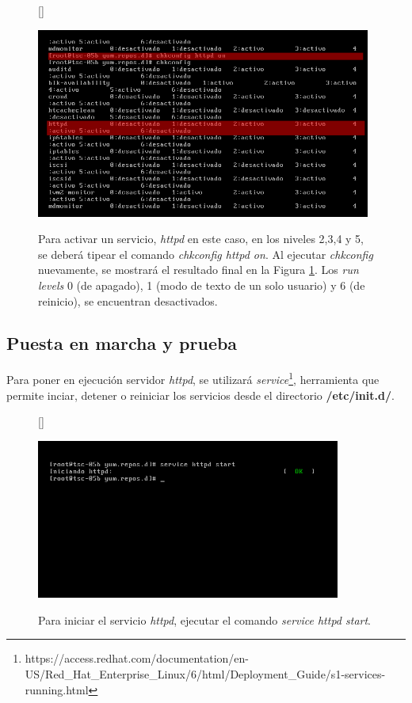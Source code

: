 \documentclass[11pt]{article}
\begin{document}
\clearpage

\begin{figure}[ht]
[\FBwidth]
{\caption{Para activar un servicio, \textit{httpd} en este caso, en los niveles 2,3,4 y 5, se deberá tipear el comando \textit{chkconfig httpd on}. Al ejecutar \textit{chkconfig} nuevamente, se mostrará el resultado final en la Figura \ref{fig:httpdOn}. Los \textit{run levels} 0 (de apagado), 1 (modo de texto de un solo usuario) y 6 (de reinicio), se encuentran desactivados.}\label{fig:httpdOn}}
{\includegraphics[width=11cm]{screenshots/httpd-run/chkconfig-httpd-on.png}}
\end{figure}


\subsection{Puesta en marcha y prueba}
Para poner en ejecución servidor \textit{httpd}, se utilizará \textit{service}\footnote{https://access.redhat.com/documentation/en-US/Red\_Hat\_Enterprise\_Linux/6/html/Deployment\_Guide/s1-services-running.html}, herramienta que permite inciar, detener o reiniciar los servicios desde el directorio \textbf{/etc/init.d/}. 

\begin{figure}[ht]
[\FBwidth]
{\caption{Para iniciar el servicio \textit{httpd}, ejecutar el comando \textit{service httpd start}.}\label{fig:httpdServiceStart}}
{\includegraphics[width=10cm]{screenshots/httpd-run/service-httpd-start.png}}
\end{figure}
\end{document}
